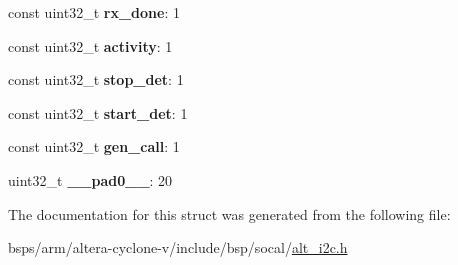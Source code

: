 \begin{DoxyCompactItemize}
const uint32\+\_\+t {\bfseries rx\+\_\+done}\+: 1
\item 
\mbox{\label{structALT__I2C__RAW__INTR__STAT__s_a173ad23ad61ac94f1667d11e7ae67463}} 
const uint32\+\_\+t {\bfseries activity}\+: 1
\item 
\mbox{\label{structALT__I2C__RAW__INTR__STAT__s_a5ca59305024d04543016b585d5e85a91}} 
const uint32\+\_\+t {\bfseries stop\+\_\+det}\+: 1
\item 
\mbox{\label{structALT__I2C__RAW__INTR__STAT__s_a313dc70963c07cf7d22af23635a9cdd0}} 
const uint32\+\_\+t {\bfseries start\+\_\+det}\+: 1
\item 
\mbox{\label{structALT__I2C__RAW__INTR__STAT__s_a316ca6681f68c1fba0ca53a5f0ab9173}} 
const uint32\+\_\+t {\bfseries gen\+\_\+call}\+: 1
\item 
\mbox{\label{structALT__I2C__RAW__INTR__STAT__s_adb60f13049db0612463e2f1a05a6ef54}} 
uint32\+\_\+t {\bfseries \+\_\+\+\_\+pad0\+\_\+\+\_\+}\+: 20
\end{DoxyCompactItemize}


The documentation for this struct was generated from the following file\+:\begin{DoxyCompactItemize}
\item 
bsps/arm/altera-\/cyclone-\/v/include/bsp/socal/\mbox{\hyperlink{socal_2alt__i2c_8h}{alt\+\_\+i2c.\+h}}\end{DoxyCompactItemize}
